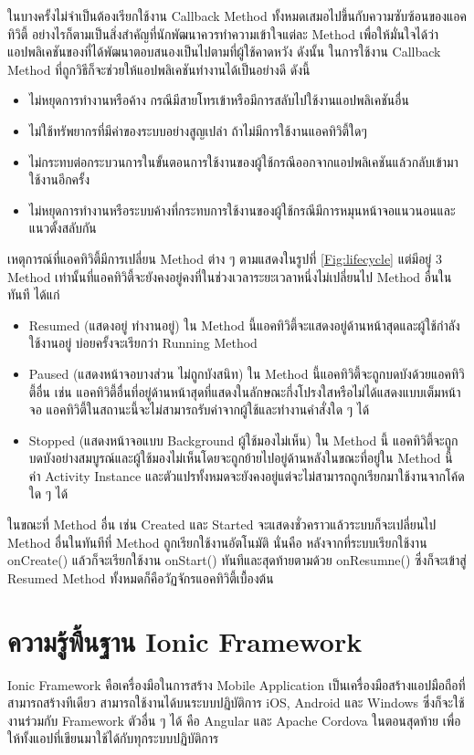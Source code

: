 	ในบางครั้งไม่จำเป็นต้องเรียกใช้งาน Callback Method ทั้งหมดเสมอไปขึ้นกับความซับซ้อนของแอคทิวิตี้ อย่างไรก็ตามเป็นสิ่งสำคัญที่นักพัฒนาควรทำความเข้าใจแต่ละ Method เพื่อให้มั่นใจได้ว่าแอปพลิเคชันของที่ได้พัฒนาตอบสนองเป็นไปตามที่ผู้ใช้คาดหวัง ดังนั้น ในการใช้งาน Callback Method
	ที่ถูกวิธีก็จะช่วยให้แอปพลิเคชันทำงานได้เป็นอย่างดี ดังนี้
	\begin{itemize}
		\item ไม่หยุดการทำงานหรือค้าง กรณีมีสายโทรเข้าหรือมีการสลับไปใช้งานแอปพลิเคชันอื่น 
		\item ไม่ใช้ทรัพยากรที่มีค่าของระบบอย่างสูญเปล่า ถ้าไม่มีการใช้งานแอคทิวิตี้ใดๆ 
		\item ไม่กระทบต่อกระบวนการในขั้นตอนการใช้งานของผู้ใช้กรณีออกจากแอปพลิเคชันแล้วกลับเข้ามาใช้งานอีกครั้ง 
		\item ไม่หยุดการทำงานหรือระบบค้างที่กระทบการใช้งานของผู้ใช้กรณีมีการหมุนหน้าจอแนวนอนและแนวตั้งสลับกัน
	\end{itemize}
	
	เหตุการณ์ที่แอคทิวิตี้มีการเปลี่ยน Method ต่าง ๆ ตามแสดงในรูปที่  \ref{Fig:lifecycle}
	แต่มีอยู่ 3 Method เท่านั้นที่แอคทิวิตี้จะยังคงอยู่คงที่ในช่วงเวลาระยะเวลาหนึ่งไม่เปลี่ยนไป Method อื่นในทันที ได้แก่
		\begin{itemize}
		\item Resumed (แสดงอยู่ ทำงานอยู่) ใน Method นี้แอคทิวิตี้จะแสดงอยู่ด้านหน้าสุดและผู้ใช้กำลังใช้งานอยู่ บ่อยครั้งจะเรียกว่า Running Method
		\item Paused (แสดงหน้าจอบางส่วน ไม่ถูกบังสนิท) ใน Method นี้แอคทิวิตี้จะถูกบดบังด้วยแอคทิวิตี้อื่น เช่น แอคทิวิตี้อื่นที่อยู่ด้านหน้าสุดที่แสดงในลักษณะกึ่งโปรงใสหรือไม่ได้แสดงแบบเต็มหน้าจอ  แอคทิวิตี้ในสถานะนี้จะไม่สามารถรับค่าจากผู้ใช้และทำงานคำสั่งใด ๆ ได้
		\item Stopped (แสดงหน้าจอแบบ Background ผู้ใช้มองไม่เห็น) ใน Method นี้ แอคทิวิตี้จะถูกบดบังอย่างสมบูรณ์และผู้ใช้มองไม่เห็นโดยจะถูกย้ายไปอยู่ด้านหลังในขณะที่อยู่ใน Method นี้
		ค่า Activity Instance และตัวแปรทั้งหมดจะยังคงอยู่แต่จะไม่สามารถถูกเรียกมาใช้งานจากโค้ดใด ๆ ได้
		\end{itemize}
		ในขณะที่ Method อื่น เช่น Created และ Started จะแสดงชั่วคราวแล้วระบบก็จะเปลี่ยนไป Method อื่นในทันทีที่ Method ถูกเรียกใช้งานอัตโนมัติ นั่นคือ หลังจากที่ระบบเรียกใช้งาน onCreate() แล้วก็จะเรียกใช้งาน onStart()
		ทันทีและสุดท้ายตามด้วย onResumne()  ซึ่งก็จะเข้าสู่ Resumed Method ทั้งหมดก็คือวัฏจักรแอคทิวิตี้เบื้องต้น

	 \section{ความรู้พื้นฐาน Ionic Framework}
	 Ionic Framework คือเครื่องมือในการสร้าง Mobile Application เป็นเครื่องมือสร้างแอปมือถือที่สามารถสร้างทีเดียว สามารถใช้งานได้บนระบบปฏิบัติการ 
	 iOS, Android และ Windows ซึ่งก็จะใช้งานร่วมกับ Framework ตัวอื่น ๆ ได้ คือ Angular และ Apache Cordova 
	 ในตอนสุดท้าย เพื่อให้ทั้งแอปที่เขียนมาใช้ได้กับทุกระบบปฏิบัติการ

